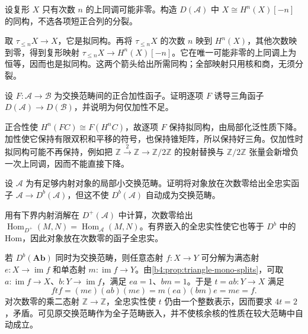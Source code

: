 \begin{exercise}\label{b4:ex:17-truncation-object}
	设复形 \(X\) 只有次数 \(n\) 的上同调可能非零。构造 \(D(\mathcal A)\) 中 \(X\cong H^n(X)[-n]\) 的同构，不选各项短正合列的分裂。
\end{exercise}
\begin{solution}
	取 \(\tau_{\le n}X\to X\)，它是拟同构。再将 \(\tau_{\le n}X\) 的次数 \(n\) 映到 \(H^n(X)\)，其他次数映到零，得到复形映射 \(\tau_{\le n}X\to H^n(X)[-n]\)。它在唯一可能非零的上同调上为恒等，因而也是拟同构。这两个箭头给出所需同构；全部映射只用核和商，无须分裂。
\end{solution}

\begin{exercise}\label{b4:ex:17-localization-functor}
	设 \(F:\mathcal A\to\mathcal B\) 为交换范畴间的正合加性函子。证明逐项 \(F\) 诱导三角函子 \(D(\mathcal A)\to D(\mathcal B)\)，并说明为何仅加性不足。
\end{exercise}
\begin{solution}
	正合性使 \(H^n(FC)\cong F(H^nC)\)，故逐项 \(F\) 保持拟同构，由局部化泛性质下降。加性使它保持有限双积和平移的符号，也保持锥矩阵，所以保持好三角。仅加性时拟同构可能不再保持，例如把 \(\mathbb Z\xrightarrow{2}\mathbb Z\to\mathbb Z/2\mathbb Z\) 的投射替换与 \(\mathbb Z/2\mathbb Z\) 张量会新增负一次上同调，因而不能直接下降。
\end{solution}

\begin{exercise}\label{b4:ex:17-abelian-embedding}
	设 \(\mathcal A\) 为有足够内射对象的局部小交换范畴。证明将对象放在次数零给出全忠实函子 \(\mathcal A\to D^b(\mathcal A)\)，但这不使 \(D^b(\mathcal A)\) 自动成为交换范畴。
\end{exercise}
\begin{solution}
	用有下界内射消解在 \(D^+(\mathcal A)\) 中计算，次数零给出 \(\operatorname{Hom}_{D^+}(M,N)=\operatorname{Hom}_{\mathcal A}(M,N)\)。有界嵌入的全忠实性使它也等于 \(D^b\) 中的 Hom，因此对象放在次数零的函子全忠实。

	若 \(D^b(\mathbf{Ab})\) 同时为交换范畴，则任意态射 \(f:X\to Y\) 可分解为满态射 \(e:X\to\operatorname{im}f\) 和单态射 \(m:\operatorname{im}f\to Y\)。由\cref{b4:prop:triangle-mono-splits}，可取 \(a:\operatorname{im}f\to X\)、\(b:Y\to\operatorname{im}f\)，满足 \(ea=1\)、\(bm=1\)。于是 \(t=ab:Y\to X\) 满足
	\[
		ftf=(me)(ab)(me)=m(ea)(bm)e=me=f.
	\]
	对次数零的乘二态射 \(\mathbb Z\to\mathbb Z\)，全忠实性使 \(t\) 仍由一个整数表示，因而要求 \(4t=2\)，矛盾。可见原交换范畴作为全子范畴嵌入，并不使核余核的性质在较大范畴中自动成立。
\end{solution}

